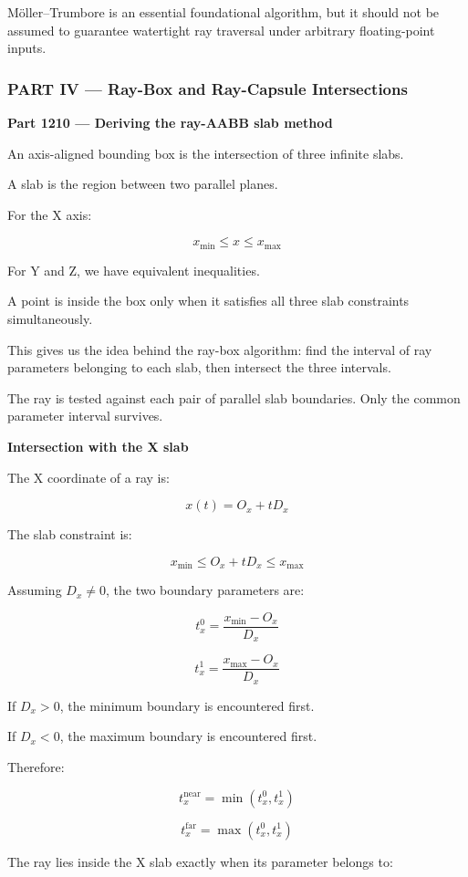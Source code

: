 Möller--Trumbore is an essential foundational algorithm, but it should not be assumed to guarantee watertight ray traversal under arbitrary floating-point inputs.

\subsubsection{PART IV --- Ray-Box and Ray-Capsule Intersections}\label{part-iv-ray-box-and-ray-capsule-intersections}

\textbf{Part 1210 --- Deriving the ray-AABB slab method}

An axis-aligned bounding box is the intersection of three infinite slabs.

A slab is the region between two parallel planes.

For the X axis:

\[
x_{\min}\le x\le x_{\max}
\]

For Y and Z, we have equivalent inequalities.

A point is inside the box only when it satisfies all three slab constraints simultaneously.

This gives us the idea behind the ray-box algorithm: find the interval of ray parameters belonging to each slab, then intersect the three intervals.

The ray is tested against each pair of parallel slab boundaries. Only the common parameter interval survives.

\textbf{Intersection with the X slab}

The X coordinate of a ray is:

\[
x(t)=O_x+tD_x
\]

The slab constraint is:

\[
x_{\min}\le O_x+tD_x\le x_{\max}
\]

Assuming \(D_x\ne0\), the two boundary parameters are:

\[
\boxed{ t_x^0=\frac{x_{\min}-O_x}{D_x} }
\]

\[
\boxed{ t_x^1=\frac{x_{\max}-O_x}{D_x} }
\]

If \(D_x>0\), the minimum boundary is encountered first.

If \(D_x<0\), the maximum boundary is encountered first.

Therefore:

\[
\boxed{ t_x^{\mathrm{near}}=\min(t_x^0,t_x^1) }
\]

\[
\boxed{ t_x^{\mathrm{far}}=\max(t_x^0,t_x^1) }
\]

The ray lies inside the X slab exactly when its parameter belongs to:

